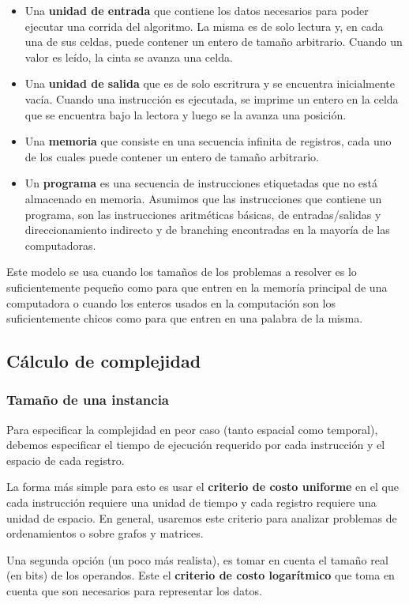 \begin{itemize}
	\item Una \textbf{unidad de entrada} que contiene los datos necesarios para poder ejecutar una corrida del algoritmo. La misma es de solo lectura y, en cada una de sus celdas, puede contener un entero de tamaño arbitrario. Cuando un valor es leído, la cinta se avanza una celda.
	\item Una \textbf{unidad de salida} que es de solo escritrura y se encuentra inicialmente vacía. Cuando una instrucción es ejecutada, se imprime un entero en la celda que se encuentra bajo la lectora y luego se la avanza una posición.
	\item Una \textbf{memoria} que consiste en una secuencia infinita de registros, cada uno de los cuales puede contener un entero de tamaño arbitrario. 
	\item Un \textbf{programa} es una secuencia de instrucciones etiquetadas que no está almacenado en memoria. Asumimos que las instrucciones que contiene un programa, son las instrucciones aritméticas básicas, de entradas/salidas y direccionamiento indirecto y de branching encontradas en la mayoría de las computadoras.
\end{itemize}

Este modelo se usa cuando los tamaños de los problemas a resolver es lo suficientemente pequeño como para que entren en la memoría principal de una computadora o cuando los enteros usados en la computación son los suficientemente chicos como para que entren en una palabra de la misma.

\subsection{Cálculo de complejidad}
\subsubsection{Tamaño de una instancia}
Para especificar la complejidad en peor caso (tanto espacial como temporal), debemos especificar el tiempo de ejecución requerido por cada instrucción y el espacio de cada registro.

La forma más simple para esto es usar el \textbf{criterio de costo uniforme} en el que cada instrucción requiere una unidad de tiempo y cada registro requiere una unidad de espacio. En general, usaremos este criterio para analizar problemas de ordenamientos o sobre grafos y matrices.


Una segunda opción (un poco más realista), es tomar en cuenta el tamaño real (en bits) de los operandos. Este el \textbf{criterio de costo logarítmico} que toma en cuenta que son necesarios para representar los datos. 
